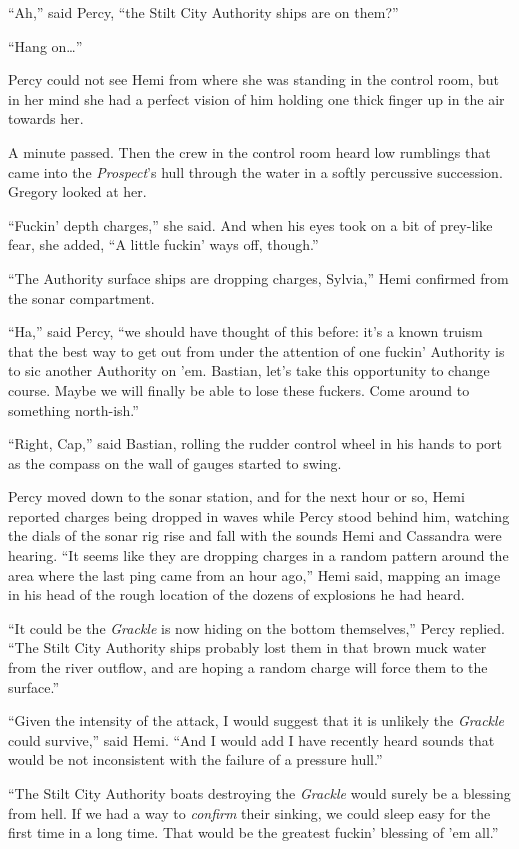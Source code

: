 \documentclass[
]{scrbook}
\begin{document}
``Ah,'' said Percy, ``the Stilt City Authority ships are on them?''

``Hang on\ldots{}''

Percy could not see Hemi from where she was standing in the control
room, but in her mind she had a perfect vision of him holding one thick
finger up in the air towards her.

A minute passed. Then the crew in the control room heard low rumblings
that came into the \emph{Prospect}'s hull through the water in a softly
percussive succession. Gregory looked at her.

``Fuckin' depth charges,'' she said. And when his eyes took on a bit of
prey-like fear, she added, ``A little fuckin' ways off, though.''

``The Authority surface ships are dropping charges, Sylvia,'' Hemi
confirmed from the sonar compartment.

``Ha,'' said Percy, ``we should have thought of this before: it's a
known truism that the best way to get out from under the attention of
one fuckin' Authority is to sic another Authority on 'em. Bastian, let's
take this opportunity to change course. Maybe we will finally be able to
lose these fuckers. Come around to something north-ish.''

``Right, Cap,'' said Bastian, rolling the rudder control wheel in his
hands to port as the compass on the wall of gauges started to swing.

Percy moved down to the sonar station, and for the next hour or so, Hemi
reported charges being dropped in waves while Percy stood behind him,
watching the dials of the sonar rig rise and fall with the sounds Hemi
and Cassandra were hearing. ``It seems like they are dropping charges in
a random pattern around the area where the last ping came from an hour
ago,'' Hemi said, mapping an image in his head of the rough location of
the dozens of explosions he had heard.

``It could be the \emph{Grackle} is now hiding on the bottom
themselves,'' Percy replied. ``The Stilt City Authority ships probably
lost them in that brown muck water from the river outflow, and are
hoping a random charge will force them to the surface.''

``Given the intensity of the attack, I would suggest that it is unlikely
the \emph{Grackle} could survive,'' said Hemi. ``And I would add I have
recently heard sounds that would be not inconsistent with the failure of
a pressure hull.''

``The Stilt City Authority boats destroying the \emph{Grackle} would
surely be a blessing from hell. If we had a way to \emph{confirm} their
sinking, we could sleep easy for the first time in a long time. That
would be the greatest fuckin' blessing of 'em all.''
\end{document}
